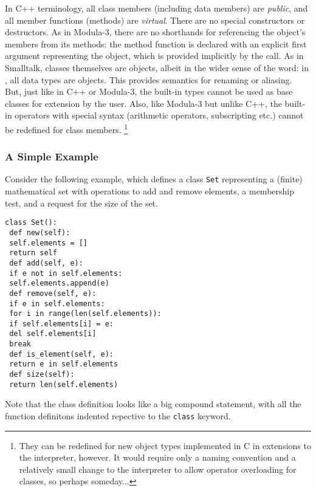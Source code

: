 In C++ terminology, all class members (including data members) are
{\em public},
and all member functions (methods) are
{\em virtual}.
There are no special constructors or destructors.
As in Modula-3, there are no shorthands for referencing the object's
members from its methods: the method function is declared with an
explicit first argument representing the object, which is provided
implicitly by the call.
As in Smalltalk, classes themselves are objects, albeit in the wider
sense of the word: in \Python, all data types are objects.
This provides semantics for renaming or aliasing.
But, just like in C++ or Modula-3, the built-in types cannot be used as
base classes for extension by the user.
Also, like Modula-3 but unlike C++, the built-in operators with special
syntax (arithmetic operators, subscripting etc.) cannot be redefined for
class members.%
\footnote{
 They can be redefined for new object types implemented in C in
 extensions to the interpreter, however. It would require only a
 naming convention and a relatively small change to the
 interpreter to allow operator overloading for classes, so
 perhaps someday...
}

\subsubsection{A Simple Example}

Consider the following example, which defines a class {\tt Set}
representing a (finite) mathematical set with operations to add and
remove elements, a membership test, and a request for the size of the
set.
\bcode\begin{verbatim}
class Set():
 def new(self):
 self.elements = []
 return self
 def add(self, e):
 if e not in self.elements:
 self.elements.append(e)
 def remove(self, e):
 if e in self.elements:
 for i in range(len(self.elements)):
 if self.elements[i] = e:
 del self.elements[i]
 break
 def is_element(self, e):
 return e in self.elements
 def size(self):
 return len(self.elements)
\end{verbatim}\ecode
Note that the class definition looks like a big compound statement,
with all the function definitons indented repective to the
{\tt class}
keyword.

